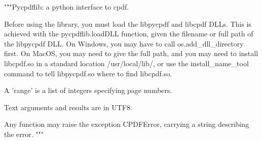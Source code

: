 """Pycpdflib: a python interface to cpdf.

Before using the library, you must load the libpycpdf and libcpdf DLLs. This is
achieved with the pycpdflib.loadDLL function, given the filename or full path
of the libpycpdf DLL.  On Windows, you may have to call os.add_dll_directory
first. On MacOS, you may need to give the full path, and you may need to
install libcpdf.so in a standard location /usr/local/lib/, or use the
install_name_tool command to tell libpycpdf.so where to find libcpdf.so.

A 'range' is a list of integers specifying page numbers.

Text arguments and results are in UTF8.

Any function may raise the exception CPDFError, carrying a string describing
the error. """
